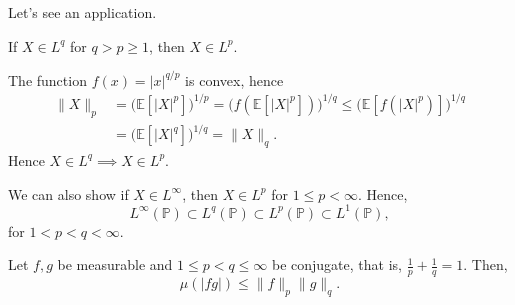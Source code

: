 \documentclass[12pt]{article}
\begin{document}
Let's see an application.

\begin{proposition}
	If $X \in L^q$ for $q > p \geq 1$, then $X \in L^p$.
\end{proposition}

\begin{proofbox}
	The function $f(x) = |x|^{q/p}$ is convex, hence
	\begin{align*}
		\|X\|_p &= \bigl( \mathbb{E}[|X|^p] \bigr)^{1/p} = \bigl( f(\mathbb{E}[|X|^{p}]) \bigr)^{1/q} \leq \bigl( \mathbb{E}[f(|X|^{p})] \bigr)^{1/q} \\
			&= \bigl( \mathbb{E}[|X|^{q}] \bigr)^{1/q} = \|X\|_q.
	\end{align*}
	Hence $X \in L^q \implies X \in L^p$.
\end{proofbox}

We can also show if $X \in L^\infty$, then $X \in L^p$ for $1 \leq p < \infty$. Hence,
\[
L^{\infty}(\mathbb{P}) \subset L^q (\mathbb{P}) \subset L^p (\mathbb{P}) \subset L^1 (\mathbb{P}),
\]
for $1 < p < q < \infty$.


\begin{theorem}
	Let $f, g$ be measurable and $1 \leq p < q \leq \infty$ be conjugate, that is, $\frac{1}{p} + \frac1q = 1$. Then,
	\[
	\mu(|fg|) \leq \|f\|_p \|g\|_q.
	\]
\end{theorem}
\end{document}
